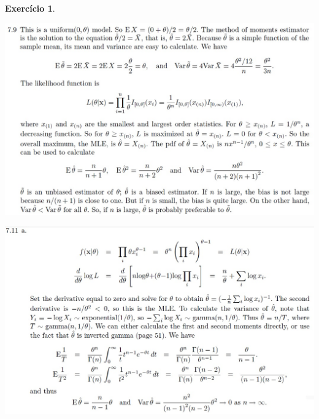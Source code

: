 \documentclass[letter,11pt]{article}
\newtheorem{exer}{Exercício}
\begin{document}
\begin{exer} \rm
\end{exer}
\includegraphics[scale=0.5]{gabarito_casella7_9.jpg}

\includegraphics[scale=0.5]{gabarito_casella7_11a.jpg}
\end{document}
